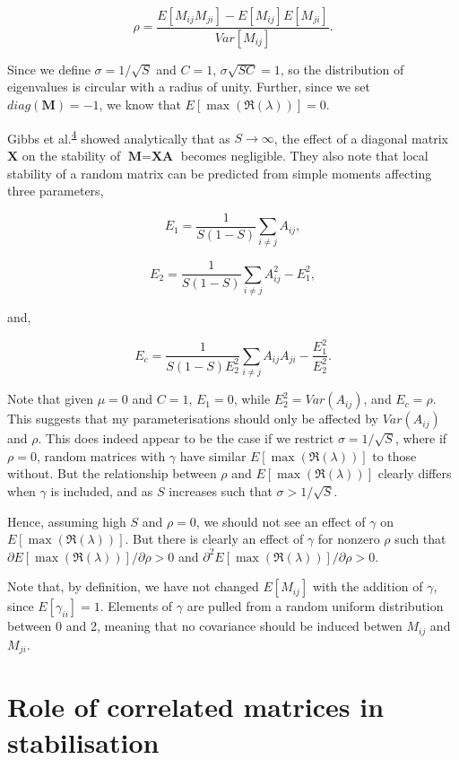 \documentclass[]{article}
\begin{document}
\[\rho = \frac{E[M_{ij}M_{ji}] - E[M_{ij}]E[M_{ji}]}{Var[M_{ij}]}.\]

Since we define \(\sigma = 1/\sqrt{S}\) and \(C = 1\),
\(\sigma\sqrt{SC} = 1\), so the distribution of eigenvalues is circular
with a radius of unity. Further, since we set \(diag(\textbf{M}) = -1\),
we know that \(E[\max(\Re(\lambda))] = 0\).

Gibbs et al.\textsuperscript{\protect\hyperlink{ref-Gibbs2017}{4}}
showed analytically that as \(S \to \infty\), the effect of a diagonal
matrix \(\textbf{X}\) on the stability of \(\textbf{M} = \textbf{XA}\)
becomes negligible. They also note that local stability of a random
matrix can be predicted from simple moments affecting three parameters,

\[E_{1} = \frac{1}{S(1-S)}\sum_{i \neq j}A_{ij},\]

\[E_{2} = \frac{1}{S(1-S)}\sum_{i \neq j}A^{2}_{ij} - E^{2}_{1},\]

and,

\[E_{c} = \frac{1}{S(1-S)E^{2}_{2}}\sum_{i \neq j} A_{ij} A_{ji} - \frac{E^{2}_{1}}{E^{2}_{2}}.\]

Note that given \(\mu = 0\) and \(C = 1\), \(E_{1} = 0\), while
\(E^{2}_{2} = Var(A_{ij})\), and \(E_{c} = \rho\). This suggests that my
parameterisations should only be affected by \(Var(A_{ij})\) and
\(\rho\). This does indeed appear to be the case if we restrict
\(\sigma = 1/\sqrt{S}\), where if \(\rho = 0\), random matrices with
\(\gamma\) have similar \(E[\max(\Re(\lambda))]\) to those without. But
the relationship between \(\rho\) and \(E[\max(\Re(\lambda))]\) clearly
differs when \(\gamma\) is included, and as \(S\) increases such that
\(\sigma > 1/\sqrt{S}\).

Hence, assuming high \(S\) and \(\rho = 0\), we should not see an effect
of \(\gamma\) on \(E[\max(\Re(\lambda))]\). But there is clearly an
effect of \(\gamma\) for nonzero \(\rho\) such that
\(\partial E[\max(\Re(\lambda))] / \partial\rho > 0\) and
\(\partial^{2} E[\max(\Re(\lambda))] / \partial\rho > 0\).

Note that, by definition, we have not changed \(E[M_{ij}]\) with the
addition of \(\gamma\), since \(E[\gamma_{ii}] = 1\). Elements of
\(\gamma\) are pulled from a random uniform distribution between 0 and
2, meaning that no covariance should be induced betwen \(M_{ij}\) and
\(M_{ji}\).

\section{Role of correlated matrices in
stabilisation}\label{role-of-correlated-matrices-in-stabilisation}
\end{document}
